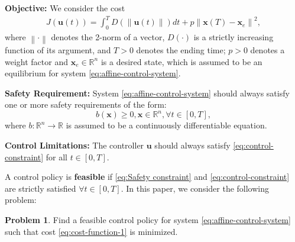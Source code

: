\documentclass[letterpaper, 10 pt, conference]{ieeeconf}
\theoremstyle{definition}
\newtheorem{problem}{Problem}
\begin{document}
\textbf{Objective:} We consider the cost  
\begin{equation}
\label{eq:cost-function-1}
\begin{split}
 J(\boldsymbol{u}(t))=\int_{0}^{T} 
 D(\left \| \boldsymbol{u}(t) \right \|)dt+p\left \| \boldsymbol{x}(T)-\boldsymbol{x}_{e} \right \| ^{2},
\end{split}
\end{equation}
where $\left \| \cdot \right \|$ denotes the 2-norm of a vector, $D(\cdot)$ is a strictly increasing function of its argument, and $T>0$ denotes the ending time; $p>0$ denotes a weight factor and $\boldsymbol{x}_{e} \in \mathbb{R}^{n}$ is a desired state, which is assumed to be an equilibrium for system \eqref{eq:affine-control-system}. 

\textbf{Safety Requirement:} System \eqref{eq:affine-control-system} should always satisfy one or more safety requirements of the form: 
\begin{equation}
\label{eq:Safety constraint}
b(\boldsymbol{x})\ge 0, \boldsymbol{x} \in \mathbb{R}^{n}, \forall t \in [0, T],
\end{equation}
where $b:\mathbb{R}^{n}\to\mathbb{R}$ is assumed to be a continuously differentiable equation. 

\textbf{Control Limitations:} The controller $\boldsymbol{u}$ should always satisfy \eqref{eq:control-constraint} for all $t \in [0, T].$

A control policy is \textbf{feasible} if \eqref{eq:Safety constraint} and \eqref{eq:control-constraint} are strictly satisfied $\forall t \in [0, T].$ In this paper, we consider the following problem:

\begin{problem}
\label{prob:SACC-prob}
Find a feasible control policy for system \eqref{eq:affine-control-system} such that cost \eqref{eq:cost-function-1} is minimized.
\end{problem}
\end{document}
